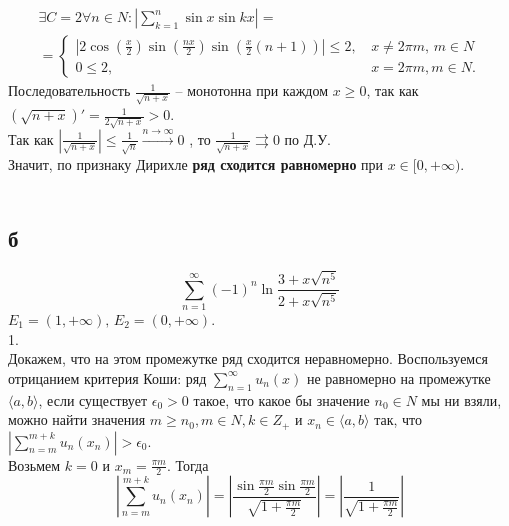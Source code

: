 \documentclass[a5paper, 10pt]{article}
\theoremstyle{definition}
\theoremstyle{plain}
\theoremstyle{remark}
\begin{document}
\begin{multline*}
\exists C= 2 \forall n \in N :  \left| \sum  \limits_{k = 1}^{n}  \sin x \sin kx \right| = \\ =
\begin{cases}
   \left|  2 \cos \left(\frac{x}{2}\right) \sin \left(\frac{nx}{2}\right) \sin \left(\frac{x}{2}(n+1)\right) \right| \leq 2,  & \, x \neq 2\pi m, \, m \in N \\
   0 \leq 2, &\, x = 2\pi m, m \in N.
 \end{cases}
\end{multline*}
Последовательность $\frac{1}{\sqrt{n + x}}$ -- монотонна при каждом $x \geq 0$, так как $\left(\sqrt{n + x} \right)' = \frac{1}{2\sqrt{n + x}} > 0$.\\
Так как $\left|\frac{1}{\sqrt{n + x}} \right| \leq \frac{1}{\sqrt{n}} \xrightarrow{n \to \infty} 0$ , то $\frac{1}{\sqrt{n + x}} \rightrightarrows 0$ по Д.У.\\
Значит, по признаку Дирихле \textbf{ряд сходится равномерно} при  $ x \in [0, + \infty)$.\\\\

\newpage
\subsection{б}
\begin{equation*}
\sum  \limits_{n = 1}^{\infty}(-1)^n \ln \frac{3+x\sqrt{n^5}}{2+x\sqrt{n^5}}
\end{equation*}
 $ E_1 = (1 , + \infty), \,  E_2 = (0 , + \infty)$.\\
1. \\


Докажем, что на этом промежутке ряд сходится неравномерно. Воспользуемся отрицанием критерия Коши: ряд $\sum  \limits_{n = 1}^{\infty} u_n (x)$ не равномерно на промежутке $\langle a, b \rangle$, если существует $\epsilon_0 > 0$ такое, что какое бы значение $n_0 \in N$ мы ни взяли, можно найти значения $m \geq n_0, m \in N, k \in Z_+$ и $x_n \in \langle a, b \rangle$ так, что $\left|  \sum  \limits_{n = m}^{m+k} u_n (x_n) \right| > \epsilon_0$. \\
Возьмем $k = 0$ и $x_m = \frac{\pi m}{2}$. Тогда
\begin{equation*}
\left|  \sum  \limits_{n = m}^{m+k} u_n (x_n) \right|  = \left| \frac{\sin  \frac{\pi m}{2} \sin  \frac{\pi m}{2}}{\sqrt{1 +  \frac{\pi m}{2}}}\right|  =  \left| \frac{1}{\sqrt{1 +  \frac{\pi m}{2}}}\right| 
\end{equation*}
\end{document}
